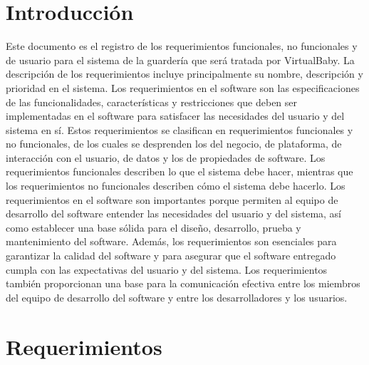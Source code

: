 \documentclass{article}
\begin{document}
\section{Introducción}
Este documento es el registro de los requerimientos funcionales, no funcionales y de usuario para el sistema de la guardería que será tratada por VirtualBaby. La descripción de los requerimientos incluye principalmente su nombre, descripción y prioridad en el sistema.
Los requerimientos en el software son las especificaciones de las funcionalidades, características y restricciones que deben ser implementadas en el software para satisfacer las necesidades del usuario y del sistema en sí. Estos requerimientos se clasifican en requerimientos funcionales y no funcionales, de los cuales se desprenden los del negocio, de plataforma, de interacción con el usuario, de datos y los de propiedades de software. Los requerimientos funcionales describen lo que el sistema debe hacer, mientras que los requerimientos no funcionales describen cómo el sistema debe hacerlo.
Los requerimientos en el software son importantes porque permiten al equipo de desarrollo del software entender las necesidades del usuario y del sistema, así como establecer una base sólida para el diseño, desarrollo, prueba y mantenimiento del software. Además, los requerimientos son esenciales para garantizar la calidad del software y para asegurar que el software entregado cumpla con las expectativas del usuario y del sistema. Los requerimientos también proporcionan una base para la comunicación efectiva entre los miembros del equipo de desarrollo del software y entre los desarrolladores y los usuarios.

\section{Requerimientos}
\end{document}

